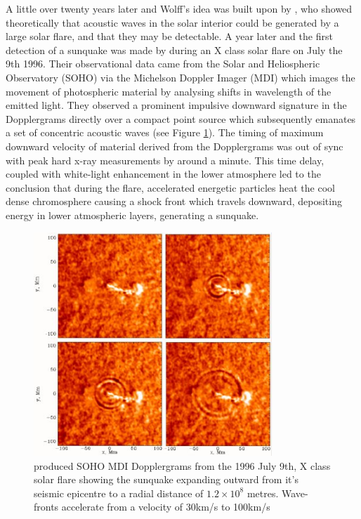 A little over twenty years later and Wolff's idea was built upon by \cite{1995ESASP.376b.341K}, who showed theoretically that acoustic waves in the solar interior could be generated by a large solar flare, and that they may be detectable. A year later and the first detection of a sunquake was made by \cite{1998Natur.393..317K} during an X class solar flare on July the 9th 1996. Their observational data came from the Solar and Heliospheric Observatory (SOHO) via the Michelson Doppler Imager (MDI) which images the movement of photospheric material by analysing shifts in wavelength of the emitted light. They observed a prominent impulsive downward signature in the Dopplergrams directly over a compact point source which subsequently emanates a set of concentric acoustic waves (see Figure \ref{mdiquake96}). The timing of maximum downward velocity of material derived from the Dopplergrams was out of sync with peak hard x-ray measurements by around a minute. This time delay, coupled with white-light enhancement in the lower atmosphere led to the conclusion that during the flare, accelerated energetic particles heat the cool dense chromosphere causing a shock front which travels downward, depositing energy in lower atmospheric layers, generating a sunquake.

\begin{figure}[hb]
  \begin{center}
  \includegraphics[width=0.80\textwidth]{soho-mdi-quake-96}
\caption{\cite{1998Natur.393..317K} produced SOHO MDI Dopplergrams from the 1996 July 9th, X class solar flare showing the sunquake expanding outward from it's seismic epicentre to a radial distance of $1.2\times10^{8}$ metres. Wave-fronts accelerate from a velocity of 30km/s to 100km/s}\label{mdiquake96}
\end{center}
\end{figure}



